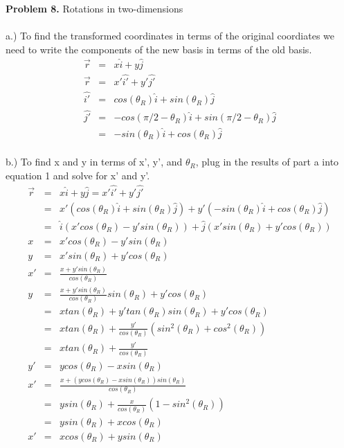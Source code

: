 \documentclass[11pt]{amsart}
\begin{document}
\textbf{Problem 8.} Rotations in two-dimensions \\ \\
a.) To find the transformed coordinates in terms of the original coordiates we need to write the components of the new basis in terms of the old basis. \\
\begin{eqnarray*}
\vec{r} &=& x\hat{i} + y\hat{j} \\
\vec{r} &=& x'\hat{i'} + y'\hat{j'} \\
\hat{i'} &=& cos(\theta_{R})\hat{i} + sin(\theta_{R})\hat{j} \\
\hat{j'} &=& -cos(\pi/2 -\theta_{R})\hat{i} + sin(\pi/2 - \theta_{R})\hat{j} \\
&=& -sin(\theta_{R})\hat{i} + cos(\theta_{R})\hat{j}
\end{eqnarray*} \\
b.) To find x and y in terms of x', y', and $\theta_{R}$, plug in the results of part a into equation 1 and solve for x' and y'. \\
\begin{eqnarray*} 
\vec{r} &=& x\hat{i} + y\hat{j} = x'\hat{i'} + y'\hat{j'} \\
&=& x'(cos(\theta_{R})\hat{i} + sin(\theta_{R})\hat{j}) + y'( -sin(\theta_{R})\hat{i} + cos(\theta_{R})\hat{j}) \\
&=& \hat{i}(x'cos(\theta_{R})-y'sin(\theta_{R}))+\hat{j}(x'sin(\theta_{R})+y'cos(\theta_{R})) \\
x &=& x'cos(\theta_{R})-y'sin(\theta_{R}) \\
y &=& x'sin(\theta_{R})+y'cos(\theta_{R}) \\
x' &=& \frac{x+y'sin(\theta_{R})}{cos(\theta_{R})} \\
y &=&  \frac{x+y'sin(\theta_{R})}{cos(\theta_{R})}sin(\theta_{R})+y'cos(\theta_{R}) \\
&=& xtan(\theta_{R})+y'tan(\theta_{R})sin(\theta_{R})+y'cos(\theta_{R}) \\
&=&  xtan(\theta_{R})+\frac{y'}{cos(\theta_{R})}(sin^{2}(\theta_{R})+cos^{2}(\theta_{R})) \\
&=& xtan(\theta_{R})+\frac{y'}{cos(\theta_{R})} \\
y' &=& ycos(\theta_{R}) - xsin(\theta_{R}) \\
x' &=&  \frac{x+(ycos(\theta_{R}) - xsin(\theta_{R}))sin(\theta_{R})}{cos(\theta_{R})} \\
&=& ysin(\theta_{R}) +\frac{x}{cos(\theta_{R})}(1-sin^{2}(\theta_{R})) \\
&=& ysin(\theta_{R}) +xcos(\theta_{R}) \\
x' &=& xcos(\theta_{R}) + ysin(\theta_{R}) 
\end{eqnarray*} \\
\end{document}
